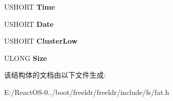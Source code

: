 \begin{DoxyCompactItemize}
U\+S\+H\+O\+RT {\bfseries Time}
\item 
\mbox{\label{struct_d_i_r_e_n_t_r_y_a37c75b267b77f77aab807d3b1ca4c8d0}} 
U\+S\+H\+O\+RT {\bfseries Date}
\item 
\mbox{\label{struct_d_i_r_e_n_t_r_y_a7979710c169524bec9be5f15e72c1041}} 
U\+S\+H\+O\+RT {\bfseries Cluster\+Low}
\item 
\mbox{\label{struct_d_i_r_e_n_t_r_y_a81e4211107eeeaa0daf32614260b1ac4}} 
U\+L\+O\+NG {\bfseries Size}
\end{DoxyCompactItemize}


该结构体的文档由以下文件生成\+:\begin{DoxyCompactItemize}
\item 
E\+:/\+React\+O\+S-\/0../boot/freeldr/freeldr/include/fs/fat.\+h\end{DoxyCompactItemize}

